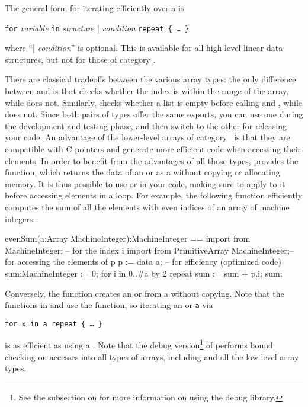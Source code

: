 The general form for iterating efficiently over a
 is\\
\centerline{ {\tt for} {\em variable} {\tt in} {\em structure}
| {\em condition} {\tt repeat \{ \dots~\}} }
where ``| {\em condition}'' is optional. This is available
for all high-level linear data structures,
but not for those of category .

There are classical tradeoffs between the various array types:
the only difference between  and 
is that  checks whether the index is within the range
of the array, while  does not. Similarly,
 checks whether a list is empty before calling
 and , while 
does not.
Since both pairs of types offer the same exports,
you can use one during the development
and testing phase, and then switch to the other for releasing your code.
An advantage of the lower-level arrays of category~
is that they are compatible with C pointers and
generate more efficient code when accessing their elements.
In order to benefit from the advantages of all those types,
\libaldor{} provides the  function,
which returns the data of an  or 
as a  without copying or allocating memory.
It is thus possible to use  or 
in your code, making sure to
apply  to it before accessing elements in a loop.
For example, the following function efficiently computes the sum
of all the elements with even indices of an array of machine integers:
\begin{ttyout}
evenSum(a:Array MachineInteger):MachineInteger == {
    import from MachineInteger;               -- for the index i
    import from PrimitiveArray MachineInteger;-- for accessing the elements of p
    p := data a;                              -- for efficiency (optimized code)
    sum:MachineInteger := 0;
    for i in 0..#a by 2 repeat sum := sum + p.i;
    sum;
}
\end{ttyout}
\noindent
Conversely, the function 
creates an  or 
from a  without copying.
Note that the
 functions
in  and  use the 
function, so iterating an  or  {\tt a} via\\
\centerline{{\tt for x in a repeat \{ \dots~\}}}
is as efficient as using a .
Note that the debug version\footnote{See the subsection
on  for more information on using the
debug library.} of \libaldor{} performs bound checking on
accesses into all types of arrays, including  and
all the low-level array types.

